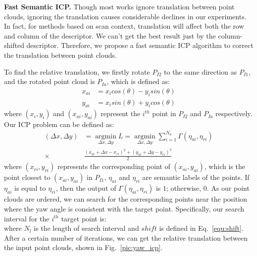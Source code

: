 \documentclass[letterpaper, 10 pt, conference]{ieeeconf}
\begin{document}
\textbf{Fast Semantic ICP.}\label{ssc:icp}
Though most works ignore translation between point clouds, ignoring the translation causes considerable declines in our experiments. In fact, for methods based on scan context, translation will affect both the row and column of the descriptor. We can’t get the best result just by the column-shifted descriptor. Therefore, we propose a fast semantic ICP algorithm to correct the translation between point clouds.



To find the relative translation, we firstly rotate \(P_{I2}\) to the same direction as \(P_{I1}\), and the rotated point cloud is \(P_{Ia}\), which is defined as:
 \begin{equation}
     \begin{aligned}
         x_{ai}&=x_icos(\theta)-y_isin(\theta)\\
         y_{ai}&=x_isin(\theta)+y_icos(\theta)
     \end{aligned}
 \end{equation}
where \((x_i,y_i)\) and \((x_{ai},y_{ai})\) represent the \(i^{th}\) point in \(P_{I2}\) and \(P_{Ia}\) respectively. Our ICP problem can be defined as:
 \begin{equation}\label{eq:icp}
     \begin{aligned}
        (\Delta x,\Delta y)&=\mathop{argmin}\limits_{\Delta x,\Delta y}L=\mathop{argmin}\limits_{\Delta x,\Delta y}\sum_{i = 1}^{N_a}\Gamma(\eta_{ai},\eta_{ri})\\
        \times&\frac{(x_{ai}+\Delta x-x_{ri})^2+(y_{ai}+\Delta y-y_{ri})^2}{2}
     \end{aligned}
 \end{equation}
 where \((x_{ri},y_{ri})\) represents the corresponding point of \((x_{ai},y_{ai})\), which is the point closest to \((x_{ai},y_{ai})\) in \(P_{I1}\), $\eta_{ai}$ and $\eta_{ri}$ are semantic labels of the points. If $\eta_{ai}$ is equal to $\eta_{ri}$, then the output of $\Gamma(\eta_{ai},\eta_{ri})$ is $1$; otherwise, $0$. As our point clouds are ordered, we can search for the corresponding points near the position where the yaw angle is consistent with the target point. Specifically, our search interval for the \(i^{th}\) target point is:
 \begin{equation}
     [i+shift-\frac{N_l}{2},i+shift+\frac{N_l}{2}]
 \end{equation}
 where \(N_l\) is the length of search interval and \(shift\) is defined in Eq.~\ref{equ:shift}. After a certain number of iterations, we can get the relative translation between the input point clouds, shown in Fig.~\ref{pic:yaw_icp}.
\end{document}

